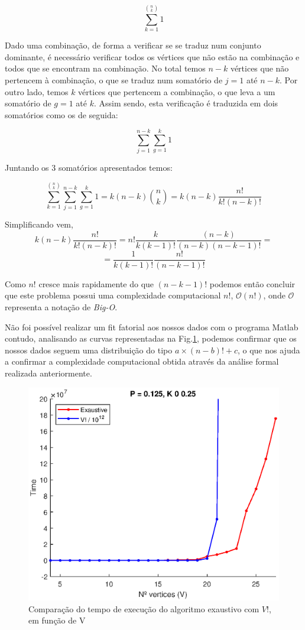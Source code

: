 \documentclass{revdetua}
\begin{document}
\[
\sum\limits_{k=1}^{n \choose k} 1
\]

Dado uma combinação, de forma a verificar se se traduz num conjunto dominante, é necessário verificar todos os vértices que não estão na combinação e todos que se encontram na combinação. No total temos $n-k$ vértices que não pertencem à combinação, o que se traduz num somatório de $j=1$ até $n-k$. Por outro lado, temos $k$ vértices que pertencem a combinação, o que leva a um somatório de $g=1$ até $k$. Assim sendo, esta verificação é traduzida em dois somatórios como os de seguida:

\[
\sum\limits_{j=1}^{n-k}\sum\limits_{g=1}^{k} 1 
\]

Juntando os 3 somatórios apresentados temos:

\[
\sum\limits_{k=1}^{n \choose k}\sum\limits_{j=1}^{n-k}\sum\limits_{g=1}^{k} 1 = k(n-k){n \choose k} = k(n-k) \frac{n!}{k! (n-k)!}
\]

Simplificando vem, 
\[
k(n-k) \frac{n!}{k! (n-k)!} = n!\frac{k}{k(k-1)!}\frac{(n-k)}{(n-k)(n-k-1)!} =
\]
\[
=\frac{1}{k(k-1)!}\frac{n!}{(n-k-1)!} 
\]

Como  $n!$ cresce mais rapidamente do que $(n-k-1)!$ podemos então concluir que este problema possui uma complexidade computacional $n!$, $\mathcal{O}(n!)$, onde $\mathcal{O}$ representa a notação de \textit{Big-O}.

Não foi possível realizar um fit fatorial aos nossos dados com o programa Matlab contudo, analisando as curvas representadas na Fig.\ref{fit}, podemos confirmar que os nossos dados seguem uma distribuição do tipo $a\times (n-b)! + c$, o que nos ajuda a confirmar a complexidade computacional obtida através da análise formal realizada anteriormente.

\begin{figure}[h!]
\centering
\includegraphics[scale = 0.5]{Figs/try_fit.eps}
\caption{Comparação do tempo de execução do algoritmo exaustivo com $V!$, em função de V}
\label{fit}
\end{figure}
\end{document}
